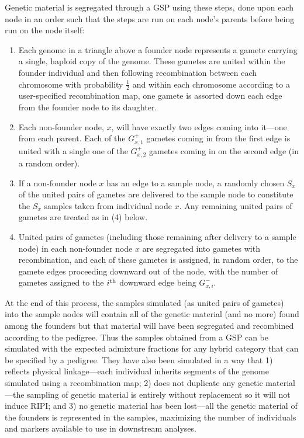 Genetic material is segregated through
a GSP using these steps, done upon each node in an order such that the steps
are run on each node's parents before being run on the node itself:
\begin{enumerate}
\item Each genome in a triangle above a founder node represents a gamete
carrying a single, haploid copy of the genome.
These gametes are united within the founder individual and then
following recombination between each chromosome
with probability $\frac{1}{2}$ and within each chromosome according to
a user-specified recombination map,
 one gamete is assorted down each edge from the founder node to its daughter.
\item Each non-founder node, $x$, will have exactly two edges coming
into it---one from each parent.  Each of the $G^+_{x,1}$ gametes coming in from the
first edge is united with a single one of the $G^+_{x,2}$ gametes coming
in on the second edge (in a random order).
\item If a non-founder node $x$ has an edge to a sample node,
a randomly chosen $S_x$ of the united pairs of gametes are delivered
to the sample node to constitute the $S_x$ samples taken from individual
node $x$. Any remaining united pairs of gametes are treated as in (4) below.
\item United pairs of gametes (including those remaining after delivery
to a sample node) in each non-founder node $x$ are segregated into
gametes with recombination, and each of these gametes is assigned, in
random order, to the gamete edges proceeding downward out of the node,
with the number of gametes assigned to the $i^\mathrm{th}$ downward edge being
$G^-_{x,i}$.
\end{enumerate}
At the end of this process, the samples simulated (as united pairs of gametes)
into the sample nodes will contain all of the genetic material (and no more) found among the founders but that 
material will have been segregated and recombined according to the pedigree.  Thus the
samples obtained from a GSP can be simulated with the expected admixture fractions
for any hybrid category that can be specified by a pedigree.  They have also been simulated
in a way that 1) reflects physical linkage---each individual inherits segments of the genome
simulated using a recombination map; 2) does not duplicate any genetic material---the sampling of
genetic material is entirely without replacement so it will not induce RIPI; and 3) no genetic material has been lost---all the genetic material of the founders
is represented in the samples, maximizing the number of individuals and markers available to
use in downstream analyses.

